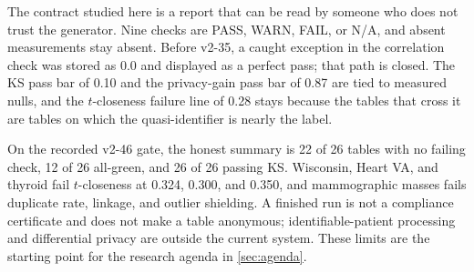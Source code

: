 \documentclass[11pt,a4paper]{article}
\begin{document}
The contract studied here is a report that can be read by someone who does not trust the generator. Nine checks are PASS, WARN, FAIL, or N/A, and absent measurements stay absent. Before v2-35, a caught exception in the correlation check was stored as 0.0 and displayed as a perfect pass; that path is closed. The KS pass bar of 0.10 and the privacy-gain pass bar of 0.87 are tied to measured nulls, and the $t$-closeness failure line of 0.28 stays because the tables that cross it are tables on which the quasi-identifier is nearly the label.

On the recorded v2-46 gate, the honest summary is 22 of 26 tables with no failing check, 12 of 26 all-green, and 26 of 26 passing KS. Wisconsin, Heart VA, and thyroid fail $t$-closeness at 0.324, 0.300, and 0.350, and mammographic masses fails duplicate rate, linkage, and outlier shielding. A finished run is not a compliance certificate and does not make a table anonymous; identifiable-patient processing and differential privacy are outside the current system. These limits are the starting point for the research agenda in \cref{sec:agenda}.
\end{document}
